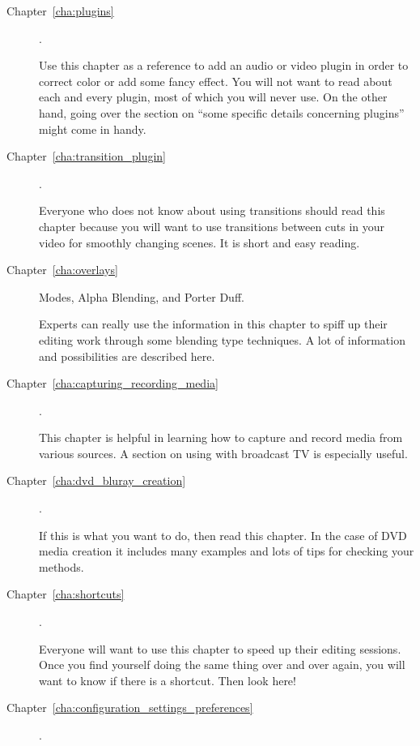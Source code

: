 \begin{description}
    \item[Chapter~\ref{cha:plugins}].

        Use this chapter as a reference to add an audio or video plugin in order to correct color or add some fancy effect.
        You will not want to read about each and every plugin, most of which you will never use.
        On the other hand, going over the section on “some specific details concerning plugins” might come in handy.

    \item[Chapter~\ref{cha:transition_plugin}] .

        Everyone who does not know about using transitions should read this chapter because you will want to use transitions between cuts in your video for smoothly changing scenes.
        It is short and easy reading.

    \item[Chapter~\ref{cha:overlays}]  Modes, Alpha Blending, and Porter Duff.

        Experts can really use the information in this chapter to spiff up their editing work through some blending type techniques.
        A lot of information and possibilities are described here.

    \item[Chapter~\ref{cha:capturing_recording_media}] .

        This chapter is helpful in learning how to capture and record media from various sources.  A section on using \CGG{} with broadcast TV is especially useful.

    \item[Chapter~\ref{cha:dvd_bluray_creation}] .

        If this is what you want to do, then read this chapter.
        In the case of DVD media creation it includes many examples and lots of tips for checking your methods.

    \item[Chapter~\ref{cha:shortcuts}] .

        Everyone will want to use this chapter to speed up their editing sessions.
        Once you find yourself doing the same thing over and over again, you will want to know if there is a shortcut. Then look here!

    \item[Chapter~\ref{cha:configuration_settings_preferences}] .


\end{description}
